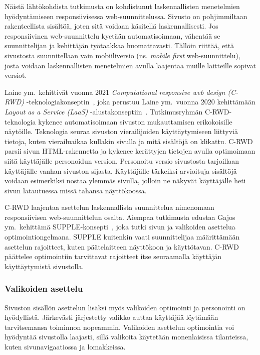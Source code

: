 \documentclass[finnish, 12pt, a4paper, elec, utf8, a-1b, online]{aaltothesis}
\begin{document}
Näistä lähtökohdista tutkimusta on kohdistunut laskennallisten menetelmien
hyödyntämiseen responsiivisessa web-suunnittelussa. Sivusto on pohjimmiltaan
rakenteellista sisältöä, joten sitä voidaan käsitellä laskennallisesti. Jos
responsiivinen web-suunnittelu kyetään automatisoimaan, vähentää se
suunnittelijan ja kehittäjän työtaakkaa huomattavasti. Tällöin riittää, että
sivustosta suunnitellaan vain mobiiliversio (ns. \textit{mobile first}
web-suunnittelu), josta voidaan laskennallisten menetelmien avulla laajentaa
muille laitteille sopivat versiot.

Laine ym.~kehittivät vuonna 2021 \textit{Computational responsive web design
(C-RWD)} -teknologiakonseptin~\cite{laine2021responsive}, joka perustuu Laine
ym.~vuonna 2020 kehittämään \textit{Layout as a Service (LaaS)}
-alustakonseptiin~\cite{laine2020_laas}. Tutkimusryhmän C-RWD-teknologia
kykenee automatisoimaan sivuston mukauttamisen erikokoisille näytöille.
Teknologia seuraa sivuston vierailijoiden käyttäytymiseen liittyviä tietoja,
kuten vierailuaikaa kullakin sivulla ja mitä sisältöjä on klikattu. C-RWD parsii
sivun HTML-rakennetta ja kykenee kerättyjen tietojen avulla optimoimaan siitä
käyttäjälle personoidun version. Personoitu versio sivustosta tarjoillaan
käyttäjälle vanhan sivuston sijasta. Käyttäjälle tärkeiksi arvioituja sisältöjä
voidaan esimerkiksi nostaa ylemmäs sivulla, jolloin ne näkyvät käyttäjälle heti
sivun latautuessa missä tahansa näyttökoossa.

C-RWD laajentaa asettelun laskennallista suunnittelua nimenomaan responsiivisen
web-suunnittelun osalta. Aiempaa tutkimusta edustaa Gajos ym.~kehittämä
SUPPLE-konsepti~\cite{10.1145/964442.964461}, joka tutki sivun ja valikoiden
asettelua optimointiongelmana. SUPPLE kuitenkin vaati suunnittelijaa
määrittämään asettelun rajoitteet, kuten päätelaitteen näyttökoon ja
käyttötavan. C-RWD päättelee optimointiin tarvittavat rajoitteet itse
seuraamalla käyttäjän käyttäytymistä sivustolla.

\subsubsection{Valikoiden asettelu}\label{menu-personalization}

Sivuston sisällön asettelun lisäksi myös valikoiden optimointi ja personointi on
hyödyllistä. Järkevästi järjestetty valikko auttaa käyttäjää löytämään
tarvitsemansa toiminnon nopeammin. Valikoiden asettelun optimointia voi
hyödyntää sivustolla laajasti, sillä valikoita käytetään monenlaisissa
tilanteissa, kuten sivunavigaatiossa ja lomakkeissa.
\end{document}
